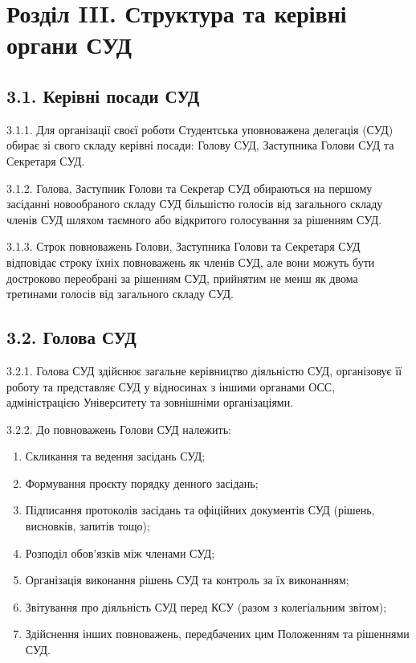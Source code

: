 \section*{Розділ III. Структура та керівні органи СУД}

\subsection*{3.1. Керівні посади СУД}
    3.1.1. Для організації своєї роботи Студентська уповноважена делегація (СУД) обирає зі свого складу керівні посади: Голову СУД, Заступника Голови СУД та Секретаря СУД.

    3.1.2. Голова, Заступник Голови та Секретар СУД обираються на першому засіданні новообраного складу СУД більшістю голосів від загального складу членів СУД шляхом таємного або відкритого голосування за рішенням СУД.

    3.1.3. Строк повноважень Голови, Заступника Голови та Секретаря СУД відповідає строку їхніх повноважень як членів СУД, але вони можуть бути достроково переобрані за рішенням СУД, прийнятим не менш як двома третинами голосів від загального складу СУД.

\subsection*{3.2. Голова СУД}
    3.2.1. Голова СУД здійснює загальне керівництво діяльністю СУД, організовує її роботу та представляє СУД у відносинах з іншими органами ОСС, адміністрацією Університету та зовнішніми організаціями.

    3.2.2. До повноважень Голови СУД належить:

        \begin{enumerate}[label=\alph*)]
            \item Скликання та ведення засідань СУД;
            \item Формування проєкту порядку денного засідань;
            \item Підписання протоколів засідань та офіційних документів СУД (рішень, висновків, запитів тощо);
            \item Розподіл обов'язків між членами СУД;
            \item Організація виконання рішень СУД та контроль за їх виконанням;
            \item Звітування про діяльність СУД перед КСУ (разом з колегіальним звітом);
            \item Здійснення інших повноважень, передбачених цим Положенням та рішеннями СУД.
        \end{enumerate}

